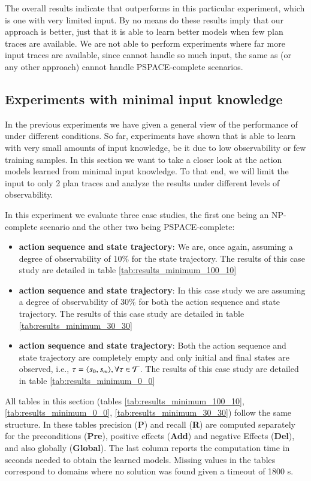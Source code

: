 The overall results indicate that \FAMA outperforms \ARMS in this particular experiment, which is one with very limited input. By no means do these results imply that our approach is better, just that it is able to learn better models when few plan traces are available. We are not able to perform experiments where far more input traces are available, since \FAMA cannot handle so much input, the same as \ARMS (or any other approach) cannot handle PSPACE-complete scenarios.



\subsection{Experiments with minimal input knowledge}
\label{minimal}
In the previous experiments we have given a general view of the performance of \FAMA under different conditions. So far, experiments have shown that \FAMA is able to learn with very small amounts of input knowledge, be it due to low observability or few training samples. In this section we want to take a closer look at the action models learned from minimal input knowledge. To that end, we will limit the input to only 2 plan traces and analyze the results under different levels of observability.

In this experiment we evaluate three case studies, the first one being an NP-complete scenario and the other two being PSPACE-complete:
\begin{itemize}
	\item \textbf{\FO action sequence and \PO state trajectory}: We are, once again, assuming a degree of observability of 10\% for the state trajectory. The results of this case study are detailed in table \ref{tab:results_minimum_100_10}
	\item  \textbf{\PO action sequence and \PO state trajectory}: In this case study we are assuming a degree of observability of 30\% for both the action sequence and state trajectory. The results of this case study are detailed in table \ref{tab:results_minimum_30_30}
	\item  \textbf{\NO action sequence and \NO state trajectory}: Both the action sequence and state trajectory are completely empty and only initial and final states are observed, i.e., $\tau = {\langle s_0, s_m \rangle}, \forall \tau \in \mathcal{T}$. The results of this case study are detailed in table \ref{tab:results_minimum_0_0}
\end{itemize}

All tables in this section (tables \ref{tab:results_minimum_100_10}, \ref{tab:results_minimum_0_0}, \ref{tab:results_minimum_30_30}) follow the same structure. In these tables precision ({\bf P}) and recall ({\bf R}) are computed separately for the preconditions ({\bf Pre}), positive effects ({\bf Add}) and negative Effects ({\bf Del}), and also globally ({\bf Global}). The last column reports the computation time in seconds needed to obtain the learned models. Missing values in the tables correspond to domains where no solution was found given a timeout of 1800 s.

